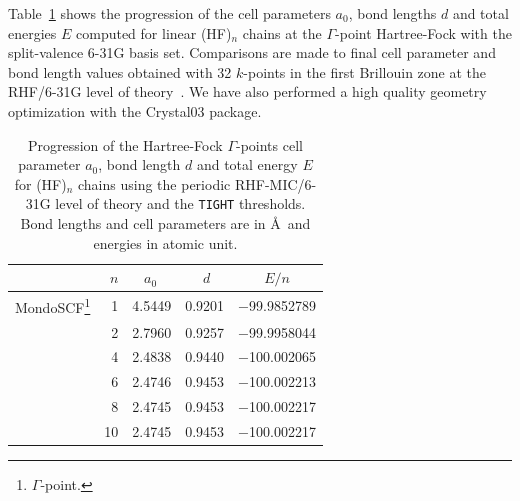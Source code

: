 \documentclass[prl,twocolumn,showpacs,twocolumngrid,superbib]{revtex4}
\begin{document}
Table~\ref{Tab:HF-n} shows the progression of the cell parameters $a_0$, bond lengths $d$ and
total energies $E$ computed for linear (HF)$_n$ chains at 
the $\Gamma$-point Hartree-Fock with the split-valence 6-31G basis set. 
Comparisons are made to final cell parameter and bond length values obtained 
with 32 $k$-points in the first Brillouin zone at the 
RHF/6-31G level of theory~\cite{DJacquemin99B}. We have also performed a high quality
geometry optimization with the {\sc Crystal03} package.


\begin{table}[t]
  \centering
  \caption{\protect
    Progression of the Hartree-Fock $\Gamma$-points cell 
    parameter $a_0$, bond length $d$ and total energy $E$ for (HF)$_n$ chains
    using the periodic RHF-MIC/6-31G level of theory and the {\tt TIGHT} thresholds.
    Bond lengths and cell parameters are in \AA~and energies in atomic unit.
  }\label{Tab:HF-n}
  \begin{tabular}{lrllc}
    \toprule
    & $n$ & $\;\;\;a_0$ & $\quad\; d$ & $E/n$ \\
    \hline
    {\sc MondoSCF}\footnote[1]{$\Gamma$-point.}
    &                1  & 4.5449 & 0.9201 & $-$99.9852789 \\
    &                2  & 2.7960 & 0.9257 & $-$99.9958044 \\
    &                4  & 2.4838 & 0.9440 & $-$100.002065 \\
    &                6  & 2.4746 & 0.9453 & $-$100.002213 \\
    &                8  & 2.4745 & 0.9453 & $-$100.002217 \\
    &               10  & 2.4745 & 0.9453 & $-$100.002217 \\

\end{tabular}
\end{table}
\end{document}
